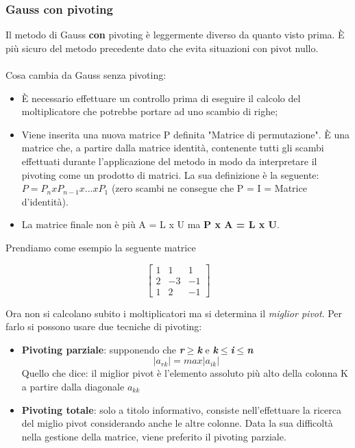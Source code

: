\subsubsection{Gauss con pivoting}
\label{Gauss con pivoting}
Il metodo di Gauss \textbf{con} pivoting è leggermente diverso da quanto visto prima. È più sicuro del metodo precedente dato che evita situazioni con pivot nullo.\\\\
Cosa cambia da Gauss senza pivoting:
\begin{itemize}
\item È necessario effettuare un controllo prima di eseguire il calcolo del moltiplicatore che potrebbe portare ad uno scambio di righe;
\item Viene inserita una nuova matrice P definita "Matrice di permutazione". È una matrice che, a partire dalla matrice identità, contenente tutti gli scambi effettuati durante l'applicazione del metodo in modo da interpretare il pivoting come un prodotto di matrici. La sua definizione è la seguente: $P = P_n x P_{n-1} x ... x P_1$  (zero scambi ne consegue che P = I = Matrice d'identità).
\item La matrice finale non è più A = L x U ma \textbf{P x A = L x U}.
\end{itemize}

\noindent

Prendiamo come esempio la seguente matrice

$$
\begin{bmatrix}
1 & 1 & 1 \\
2 & -3 & -1 \\
1 & 2 & -1 
\end{bmatrix}
$$

\noindent
Ora non si calcolano subito i moltiplicatori ma si determina il \textit{miglior pivot}. Per farlo si possono usare due tecniche di pivoting:
\begin{itemize}
\item \textbf{Pivoting parziale}: supponendo che \textbf{\textit{r$\geq$k }}e \textbf{\textit{k$\leq$i$\leq$n}}
$$ |a_{rk}| = max|a_{ik}|$$
Quello che dice: il miglior pivot è l'elemento assoluto più alto della colonna K a partire dalla diagonale $a_{kk}$
\item \textbf{Pivoting totale}: solo a titolo informativo, consiste nell'effettuare la ricerca del miglio pivot considerando anche le altre colonne. Data la sua difficoltà nella gestione della matrice, viene preferito il pivoting parziale.
\end{itemize}

